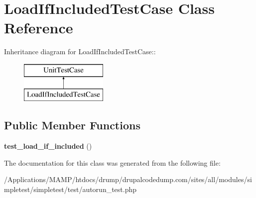 \hypertarget{class_load_if_included_test_case}{
\section{LoadIfIncludedTestCase Class Reference}
\label{class_load_if_included_test_case}
}
Inheritance diagram for LoadIfIncludedTestCase::\begin{figure}[H]
\begin{center}
\leavevmode
\includegraphics[height=2cm]{class_load_if_included_test_case}
\end{center}
\end{figure}
\subsection*{Public Member Functions}
\begin{DoxyCompactItemize}
\item 
\hypertarget{class_load_if_included_test_case_a1a909277f3658073a33b0a358b21256b}{
{\bfseries test\_\-load\_\-if\_\-included} ()}
\label{class_load_if_included_test_case_a1a909277f3658073a33b0a358b21256b}

\end{DoxyCompactItemize}


The documentation for this class was generated from the following file:\begin{DoxyCompactItemize}
\item 
/Applications/MAMP/htdocs/drump/drupalcodedump.com/sites/all/modules/simpletest/simpletest/test/autorun\_\-test.php\end{DoxyCompactItemize}
